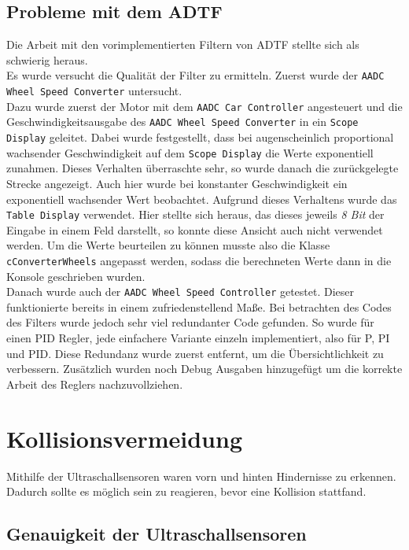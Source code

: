 \documentclass[a4paper,12pt]{report}
\begin{document}
\section{Probleme mit dem ADTF}
	Die Arbeit mit den vorimplementierten Filtern von ADTF stellte sich als schwierig heraus. \\
	Es wurde versucht die Qualität der Filter zu ermitteln.
	Zuerst wurde der \texttt{AADC Wheel Speed Converter} untersucht. \\
	Dazu wurde zuerst der Motor mit dem \texttt{AADC Car Controller} angesteuert und die Geschwindigkeitsausgabe des \texttt{AADC Wheel Speed Converter} in ein \texttt{Scope Display} geleitet.
	Dabei wurde festgestellt, dass bei augenscheinlich proportional wachsender Geschwindigkeit auf dem \texttt{Scope Display} die Werte exponentiell zunahmen.
	Dieses Verhalten überraschte sehr, so wurde danach die zurückgelegte Strecke angezeigt.
	Auch hier wurde bei konstanter Geschwindigkeit ein exponentiell wachsender Wert beobachtet.
	Aufgrund dieses Verhaltens wurde das \texttt{Table Display} verwendet.
	Hier stellte sich heraus, das dieses jeweils \emph{8 Bit} der Eingabe in einem Feld darstellt, so konnte diese Ansicht auch nicht verwendet werden.
	Um die Werte beurteilen zu können musste also die Klasse \texttt{cConverterWheels} angepasst werden, sodass die berechneten Werte dann in die Konsole geschrieben wurden. \\
	Danach wurde auch der \texttt{AADC Wheel Speed Controller} getestet.
	Dieser funktionierte bereits in einem zufriedenstellend Maße.
	Bei betrachten des Codes des Filters wurde jedoch sehr viel redundanter Code gefunden.
	So wurde für einen PID Regler, jede einfachere Variante einzeln implementiert, also für P, PI und PID.
	Diese Redundanz wurde zuerst entfernt, um die Übersichtlichkeit zu verbessern.
	Zusätzlich wurden noch Debug Ausgaben hinzugefügt um die korrekte Arbeit des Reglers nachzuvollziehen. \\


\chapter{Kollisionsvermeidung}

	Mithilfe der Ultraschallsensoren waren vorn und hinten Hindernisse zu erkennen.
	Dadurch sollte es möglich sein zu reagieren, bevor eine Kollision stattfand.

\section{Genauigkeit der Ultraschallsensoren}
\end{document}
